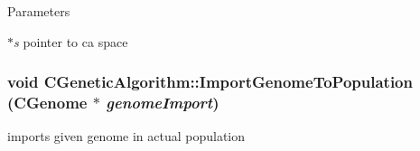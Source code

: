 \begin{DoxyParams}{Parameters}
\item[{\em $\ast$s}]pointer to ca space \end{DoxyParams}
\hypertarget{classCGeneticAlgorithm_a0992c75f2578fa1aec75996805e463cb}{
\subsubsection[{ImportGenomeToPopulation}]{\setlength{\rightskip}{0pt plus 5cm}void CGeneticAlgorithm::ImportGenomeToPopulation ({\bf CGenome} $\ast$ {\em genomeImport})}}
\label{classCGeneticAlgorithm_a0992c75f2578fa1aec75996805e463cb}
imports given genome in actual population


